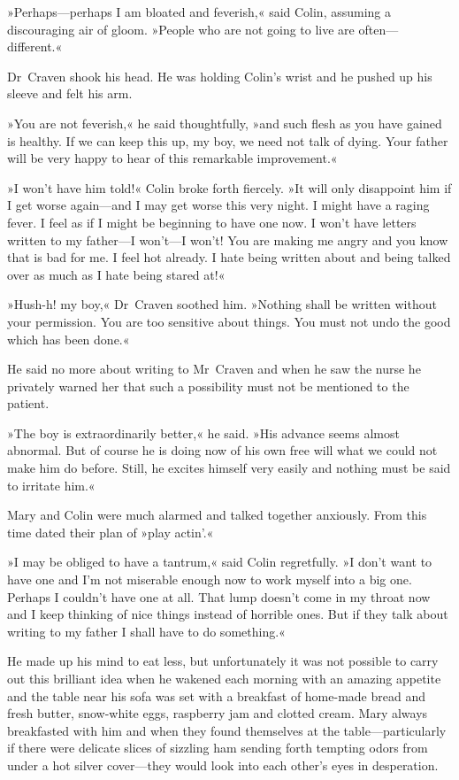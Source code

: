 »Perhaps—perhaps I am bloated and feverish,« said Colin, assuming a discouraging air of gloom. »People who are not going to live are often—different.«

Dr~Craven shook his head. He was holding Colin's wrist and he pushed up his sleeve and felt his arm.

»You are not feverish,« he said thoughtfully, »and such flesh as you have gained is healthy. If we can keep this up, my boy, we need not talk of dying. Your father will be very happy to hear of this remarkable improvement.«

»I won't have him told!« Colin broke forth fiercely. »It will only disappoint him if I get worse again—and I may get worse this very night. I might have a raging fever. I feel as if I might be beginning to have one now. I won't have letters written to my father—I won't—I won't! You are making me angry and you know that is bad for me. I feel hot already. I hate being written about and being talked over as much as I hate being stared at!«

»Hush-h! my boy,« Dr~Craven soothed him. »Nothing shall be written without your permission. You are too sensitive about things. You must not undo the good which has been done.«

He said no more about writing to Mr~Craven and when he saw the nurse he privately warned her that such a possibility must not be mentioned to the patient.

»The boy is extraordinarily better,« he said. »His advance seems almost abnormal. But of course he is doing now of his own free will what we could not make him do before. Still, he excites himself very easily and nothing must be said to irritate him.«

Mary and Colin were much alarmed and talked together anxiously. From this time dated their plan of »play actin'.«

»I may be obliged to have a tantrum,« said Colin regretfully. »I don't want to have one and I'm not miserable enough now to work myself into a big one. Perhaps I couldn't have one at all. That lump doesn't come in my throat now and I keep thinking of nice things instead of horrible ones. But if they talk about writing to my father I shall have to do something.«

He made up his mind to eat less, but unfortunately it was not possible to carry out this brilliant idea when he wakened each morning with an amazing appetite and the table near his sofa was set with a breakfast of home-made bread and fresh butter, snow-white eggs, raspberry jam and clotted cream. Mary always breakfasted with him and when they found themselves at the table—particularly if there were delicate slices of sizzling ham sending forth tempting odors from under a hot silver cover—they would look into each other's eyes in desperation.

